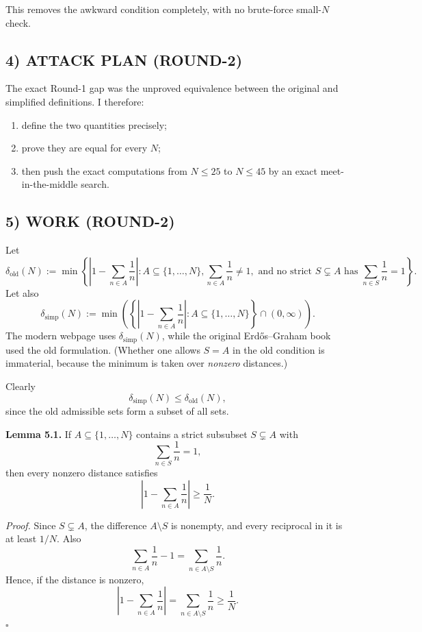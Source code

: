This removes the awkward condition completely, with no brute-force small-$N$ check.

\subsection*{4) ATTACK PLAN (ROUND-2)}
The exact Round-1 gap was the unproved equivalence between the original and simplified definitions. I therefore:

\begin{enumerate}
\item define the two quantities precisely;
\item prove they are equal for every $N$;
\item then push the exact computations from $N\le 25$ to $N\le 45$ by an exact meet-in-the-middle search.
\end{enumerate}

\subsection*{5) WORK (ROUND-2)}
Let
\[
\delta_{\mathrm{old}}(N)
:=
\min\left\{
\left|1-\sum_{n\in A}\frac1n\right|:
A\subseteq\{1,\ldots,N\},
\sum_{n\in A}\frac1n\neq 1,
\text{ and no strict }S\subsetneq A\text{ has }\sum_{n\in S}\frac1n=1
\right\}.
\]
Let also
\[
\delta_{\mathrm{simp}}(N)
:=
\min\left(\left\{
\left|1-\sum_{n\in A}\frac1n\right|:
A\subseteq\{1,\ldots,N\}
\right\}\cap (0,\infty)\right).
\]
The modern webpage uses $\delta_{\mathrm{simp}}(N)$, while the original Erd\H{o}s--Graham book used the old formulation. (Whether one allows $S=A$ in the old condition is immaterial, because the minimum is taken over \emph{nonzero} distances.)

\medskip
Clearly
\[
\delta_{\mathrm{simp}}(N)\le \delta_{\mathrm{old}}(N),
\]
since the old admissible sets form a subset of all sets.

\medskip
\textbf{Lemma 5.1.}
If $A\subseteq\{1,\ldots,N\}$ contains a strict subsubset $S\subsetneq A$ with
\[
\sum_{n\in S}\frac1n=1,
\]
then every nonzero distance satisfies
\[
\left|1-\sum_{n\in A}\frac1n\right|\ge \frac1N.
\]

\emph{Proof.}
Since $S\subsetneq A$, the difference $A\setminus S$ is nonempty, and every reciprocal in it is at least $1/N$. Also
\[
\sum_{n\in A}\frac1n-1=
\sum_{n\in A\setminus S}\frac1n.
\]
Hence, if the distance is nonzero,
\[
\left|1-\sum_{n\in A}\frac1n\right|
=
\sum_{n\in A\setminus S}\frac1n
\ge \frac1N.
\]
\hfill $\square$

